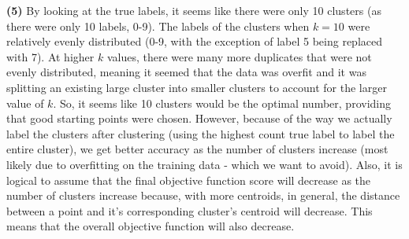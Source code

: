 \documentclass[11pt]{article}
\renewcommand{\part}[1] {\vspace{.10in} {\bf (#1)}}
\begin{document}
\part{5}
By looking at the true labels, it seems like there were only 10 clusters (as there were only 10 labels, 0-9). The labels of the clusters when $k=10$ were relatively evenly distributed (0-9, with the exception of label 5 being replaced with 7). At higher $k$ values, there were many more duplicates that were not evenly distributed, meaning it seemed that the data was overfit and it was splitting an existing large cluster into smaller clusters to account for the larger value of $k$. So, it seems like 10 clusters would be the optimal number, providing that good starting points were chosen. However, because of the way we actually label the clusters after clustering (using the highest count true label to label the entire cluster), we get better accuracy as the number of clusters increase (most likely due to overfitting on the training data - which we want to avoid). Also, it is logical to assume that the final objective function score will decrease as the number of clusters increase because, with more centroids, in general, the distance between a point and it's corresponding cluster's centroid will decrease. This means that the overall objective function will also decrease. 
\end{document}
